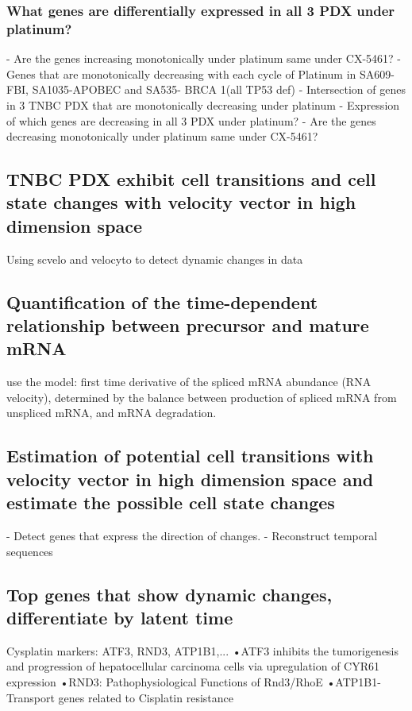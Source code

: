 \documentclass{nature}
\begin{document}
\subsubsection{What genes are differentially expressed in all 3 PDX under platinum?}
- Are the genes increasing monotonically under platinum same under CX-5461?
- Genes that are monotonically decreasing with each cycle of Platinum in SA609-FBI, SA1035-APOBEC and SA535- BRCA 1(all TP53 def)
- Intersection of genes in 3 TNBC PDX that are monotonically decreasing under platinum 
- Expression of which genes are decreasing in all 3 PDX under platinum? - Are the genes decreasing monotonically under platinum same under CX-5461?


\subsection{TNBC PDX exhibit cell transitions and cell state changes with velocity vector in high dimension space}

Using scvelo and velocyto to detect dynamic
changes in data
\subsection{Quantification of the time-dependent relationship between precursor and mature mRNA}
use the model: first time derivative of the spliced mRNA abundance (RNA velocity), determined by the
balance between production of spliced mRNA from unspliced mRNA, and mRNA degradation.

\subsection{Estimation of potential cell transitions with velocity vector in high dimension space and estimate the possible cell state changes }
- Detect genes that express the direction of changes.
- Reconstruct temporal sequences

\subsection{Top genes that show dynamic changes, differentiate by latent time} 
Cysplatin markers: ATF3, RND3, ATP1B1,...
•ATF3 inhibits the tumorigenesis and progression of hepatocellular carcinoma cells via upregulation of CYR61 expression
•RND3: Pathophysiological Functions of Rnd3/RhoE
•ATP1B1-Transport genes related to Cisplatin resistance
\end{document}
